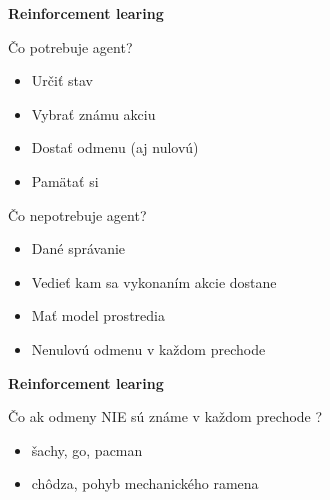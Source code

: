 \documentclass[xcolor=dvipsnames]{beamer}
\begin{document}
\begin{frame}{\bf Reinforcement learing}

\begin{minipage}{.5\textwidth}
Čo potrebuje agent?
\begin{itemize}
  \item Určiť stav
  \item Vybrať známu akciu
  \item Dostať odmenu (aj nulovú)
  \item Pamätať si
\end{itemize}

  \end{minipage}%
\begin{minipage}{.5\textwidth}
  Čo nepotrebuje agent?

  \begin{itemize}
    \item Dané správanie
    \item Vedieť kam sa vykonaním akcie dostane
    \item Mať model prostredia
    \item Nenulovú odmenu v každom prechode
  \end{itemize}

\end{minipage}


\end{frame}

\begin{frame}{\bf Reinforcement learing}

Čo ak odmeny NIE sú známe v každom prechode ?

\begin{itemize}
  \item šachy, go, pacman
  \item chôdza, pohyb mechanického ramena
\end{itemize}

\end{frame}
\end{document}
